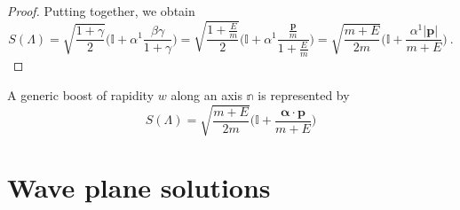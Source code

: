 \begin{example}
\begin{proof}
            Putting together, we obtain 
            \begin{equation*}
                S(\Lambda) = \sqrt{\frac{1 + \gamma}{2}} \Big ( \mathbb I + \alpha^1 \frac{\beta \gamma}{1 + \gamma}\Big) = \sqrt{\frac{1 + \frac{E}{m}}{2}} \Big ( \mathbb I + \alpha^1  \frac{\frac{\mathbf p}{m}}{1 + \frac{E}{m}}\Big) = \sqrt{\frac{m + E}{2m}} \Big ( \mathbb I + \frac{\alpha^1 |\mathbf p|}{m + E}\Big) ~.
            \end{equation*}
        \end{proof}
    \end{example}

    \begin{example}
        A generic boost of rapidity $w$ along an axis $\mathbb n$ is represented by 
        \begin{equation*}\label{genlorspi}
            S(\Lambda) = \sqrt{\frac{m + E}{2m}} \Big ( \mathbb I + \frac{\boldsymbol \alpha \cdot \mathbf p}{m + E}\Big)
        \end{equation*}
    \end{example}

\chapter{Wave plane solutions}

